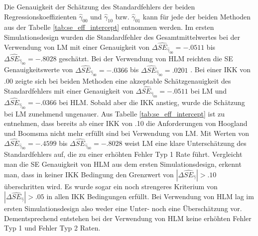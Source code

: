 \documentclass[12pt]{article}\usepackage[]{graphicx}\usepackage[]{color}
\begin{document}
Die Genauigkeit der Schätzung des Standardfehlers der beiden Regressionskoeffizienten $\widehat{\gamma}_{00}$ und $\widehat{\gamma}_{10}$ bzw. $\widehat{\gamma}_{01}$ kann für jede der beiden Methoden aus der Tabelle \ref{tab:se_eff_intercept} entnommen werden. Im ersten Simulationsdesign wurden die Standardfehler des Gesamtmittelwertes bei der Verwendung von LM mit einer Genauigkeit von $\Delta\widehat{SE}_{\widehat{\gamma}_{00}} = -.0511$ bis $\Delta\widehat{SE}_{\widehat{\gamma}_{00}} = -.8028$ geschätzt. Bei der Verwendung von HLM reichten die SE Genauigkeitswerte von $\Delta\widehat{SE}_{\widehat{\gamma}_{00}} = -.0366$ bis $\Delta\widehat{SE}_{\widehat{\gamma}_{00}} = .0201$ . Bei einer IKK von .00 zeigte sich bei beiden Methoden eine akzeptable Schätzgenauigkeit des Standardfehlers mit einer Genauigkeit von $\Delta\widehat{SE}_{\widehat{\gamma}_{00}} = -.0511$ bei LM und $\Delta\widehat{SE}_{\widehat{\gamma}_{00}} = -.0366$ bei HLM. Sobald aber die IKK anstieg, wurde die Schätzung bei LM zunehmend ungenauer. Aus Tabelle \ref{tab:se_eff_intercept} ist zu entnehmen, dass bereits ab einer IKK von .10 die Anforderungen von Hoogland und Boomsma \citeyearpar{hooglandboosma1998robustness} nicht mehr erfüllt sind bei Verwendung von LM. Mit Werten von $\Delta\widehat{SE}_{\widehat{\gamma}_{00}} = -.4599$ bis $\Delta\widehat{SE}_{\widehat{\gamma}_{00}} = -.8028$ weist LM eine klare Unterschätzung des Standardfehlers auf, die zu einer erhöhten Fehler Typ 1 Rate führt. Vergleicht man die SE Genauigkeit von HLM aus dem ersten Simulationsdesign, erkennt man, dass in keiner IKK Bedingung den Grenzwert von $|\Delta\widehat{SE}_{\widehat{\gamma}}| > .10$ überschritten wird. Es wurde sogar ein noch strengeres Kriterium von $|\Delta\widehat{SE}_{\widehat{\gamma}}| > .05$ in allen IKK Bedingungen erfüllt. Bei Verwendung von HLM lag im ersten Simulationsdesign also weder eine Unter- noch eine Überschätzung vor. Dementsprechend entstehen bei der Verwendung von HLM keine erhöhten Fehler Typ 1 und Fehler Typ 2 Raten.
\end{document}
